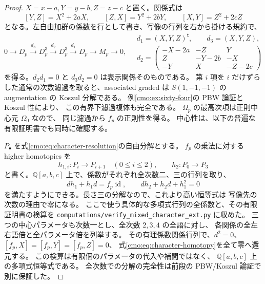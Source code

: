 \begin{proof}
$X=x-a,Y=y-b,Z=z-c$ と置く。関係式は
\[
 [Y,Z]=X^2+2aX,\qquad [Z,X]=Y^2+2bY,\qquad
 [X,Y]=Z^2+2cZ
\]
となる。左自由加群の係数を行として書き、写像の行列を右から掛ける規約で、
\begin{equation}\label{cmo:eq:character-resolution}
 0\longrightarrow D_p\xrightarrow{d_3}D_p^3
   \xrightarrow{d_2}D_p^3\xrightarrow{d_1}D_p
   \longrightarrow M_p\longrightarrow0,
 \quad
 \begin{gathered}
 d_1=(X,Y,Z)^{\mathsf t},\qquad d_3=(X,Y,Z),\\
 d_2=\begin{pmatrix}
  -X-2a&-Z&Y\\ Z&-Y-2b&-X\\ -Y&X&-Z-2c
 \end{pmatrix}
 \end{gathered}
\end{equation}
を得る。$d_2d_1=0$ と $d_3d_2=0$ は表示関係そのものである。
第 $i$ 項を $i$ だけずらした通常の次数濾過を取ると、associated graded は
$S(1,-1,-1)$ の augmentation の Koszul 分解である。
例\ref{cmo:ex:sixty-four}の PBW 論証と Koszul 性により、
この有界下濾過複体も完全である。
$\Omega_p$ の最高次項は正則中心元 $\Omega_0$ なので、
同じ濾過から $f_p$ の正則性を得る。
中心性は、以下の普遍な有限証明書でも同時に確認する。

$P_\bullet$ を式\eqref{cmo:eq:character-resolution}の自由分解とする。
$f_p$ の乗法に対する higher homotopies を
\[
 h_{1,i}:P_i\longrightarrow P_{i+1}\quad(0\leq i\leq2),
 \qquad h_2:P_0\longrightarrow P_3
\]
と書く。$\mathbb Q[a,b,c]$ 上で、係数がそれぞれ全次数二、三の行列を取り、
\begin{equation}\label{cmo:eq:character-homotopy}
 dh_1+h_1d=f_p\operatorname{id},\qquad
 dh_2+h_2d+h_1^2=0
\end{equation}
を満たすようにできる。長さ三の分解なので、これより高い恒等式は
写像先の次数の理由で零になる。
ここで使う具体的な多項式行列の全係数と、その有限証明書の検算を
\texttt{computations/verify\_mixed\_character\_ext.py} に収めた。
三つの中心パラメータも次数一とし、全次数 $2,3,4$ の全語に対し、
各関係の全左右語倍と全パラメータ倍を列挙する。
その有理係数関係行列で、$d^2=0$、$[f_p,X]=[f_p,Y]=[f_p,Z]=0$、
式\eqref{cmo:eq:character-homotopy}を全て零へ還元する。
この検算は有限個のパラメータの代入や補間ではなく、
$\mathbb Q[a,b,c]$ 上の多項式恒等式である。
全次数での分解の完全性は前段の PBW/Koszul 論証で別に保証した。


\end{proof}
